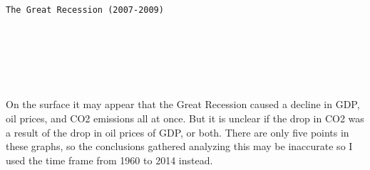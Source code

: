 \documentclass[11pt]{article}
\begin{document}
    \begin{Verbatim}[commandchars=\\\{\}]
The Great Recession (2007-2009)

    \end{Verbatim}

    \begin{center}
    \end{center}
    { \hspace*{\fill} \\}
    
    \begin{center}
    \end{center}
    { \hspace*{\fill} \\}
    
    \begin{center}
    \end{center}
    { \hspace*{\fill} \\}
    
    On the surface it may appear that the Great Recession caused a decline
in GDP, oil prices, and CO2 emissions all at once. But it is unclear if
the drop in CO2 was a result of the drop in oil prices of GDP, or both.
There are only five points in these graphs, so the conclusions gathered
analyzing this may be inaccurate so I used the time frame from 1960 to
2014 instead.
\end{document}
